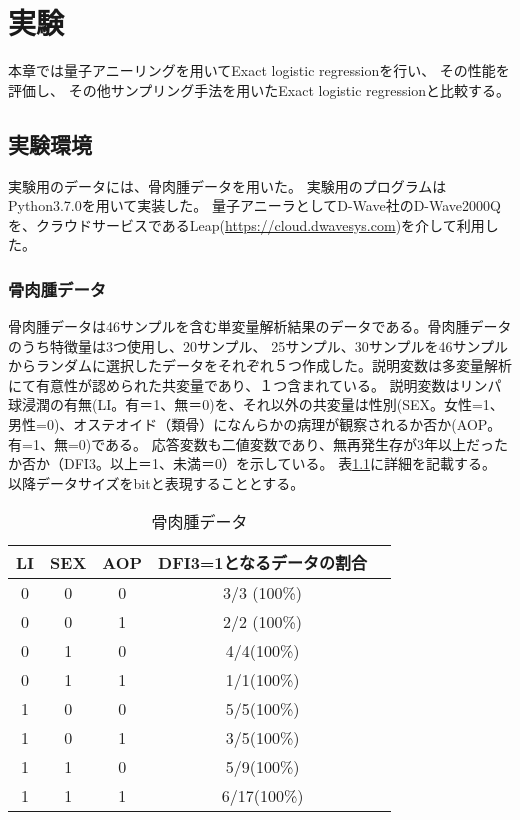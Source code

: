 \documentclass[12pt, dvipdfmx]{jmaster}
\theoremstyle{definition}
\begin{document}
\chapter{実験}
\label{sec:ex}
本章では量子アニーリングを用いてExact logistic regressionを行い、 その性能を評価し、 その他サンプリング手法を用いたExact logistic regressionと比較する。

\section{実験環境}
実験用のデータには、骨肉腫データを用いた\cite{jaffe1983osteosarcoma}。
実験用のプログラムはPython3.7.0を用いて実装した。 
量子アニーラとしてD-Wave社のD-Wave2000Qを、クラウドサービスであるLeap(\url{https://cloud.dwavesys.com})を介して利用した。

\subsection{骨肉腫データ}
\label{sec:ost}
骨肉腫データは46サンプルを含む単変量解析結果のデータである\cite{jaffe1983osteosarcoma}。骨肉腫データのうち特徴量は3つ使用し、20サンプル、 25サンプル、30サンプルを46サンプルからランダムに選択したデータをそれぞれ５つ作成した。説明変数は多変量解析にて有意性が認められた共変量であり、１つ含まれている。
説明変数はリンパ球浸潤の有無(LI。有＝1、無＝0)を、それ以外の共変量は性別(SEX。女性=1、男性=0)、オステオイド（類骨）になんらかの病理が観察されるか否か(AOP。有=1、無=0)である。
応答変数も二値変数であり、無再発生存が3年以上だったか否か（DFI3。以上＝1、未満＝0）を示している。
表\ref{tb:ost}に詳細を記載する。
以降データサイズをbitと表現することとする。


\begin{table}[hbtp]
	\caption{骨肉腫データ}
	\label{tb:ost}
	\centering
	\begin{tabular}{ccccc}
		\hline
		LI & SEX & AOP & DFI3=1となるデータの割合\\
		\hline\hline
		0 & 0 & 0 & 3/3 (100\%)\\
		0 & 0 & 1 & 2/2 (100\%)\\
		0 & 1 & 0 & 4/4(100\%)\\
		0 & 1 & 1 & 1/1(100\%)\\
		1 & 0 & 0 & 5/5(100\%)\\
		1 & 0 & 1 & 3/5(100\%)\\
		1 & 1 & 0 & 5/9(100\%)\\
		1 & 1 & 1 & 6/17(100\%)\\
		\hline
	\end{tabular}
\end{table}
\end{document}
